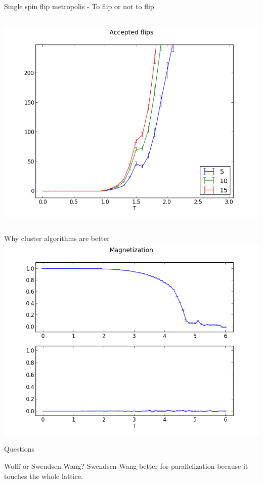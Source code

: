 \documentclass[handout]{beamer}
\begin{document}
\begin{frame}{Single spin flip metropolis - To flip or not to flip}
\begin{columns}[c]
		\includegraphics[width=\textwidth]{img/single_noAcceptedFlips.png}
\end{columns}
\end{frame}

\begin{frame}{Why cluster algorithms are better}
\includegraphics[width=\textwidth]{img/comp_magnetization.png}
\end{frame}


\begin{frame}
\centerline{\huge{Questions}}
\end{frame}

\begin{frame}{Wolff or Swendsen-Wang?}
Swendsen-Wang better for parallelization because it touches the whole lattice.
\end{frame}
\end{document}
